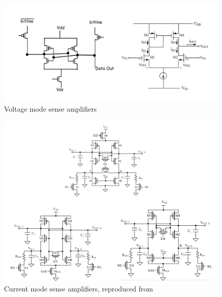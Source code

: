 \begin{figure}
  \centering
  \includegraphics[width=\textwidth]{../fig/hfdstk-sensamp-voltagemode.png}
  \caption[Voltage mode sense amplifiers]{Voltage mode sense amplifiers}
  \label{fig:voltagemodesa}
\end{figure}
\begin{figure}
  \centering
  \includegraphics[width=\textwidth]{../fig/hfdstk-sensamp-currentmode.png}
  \caption[Current mode sense amplifiers]{Current mode sense amplifiers, reproduced from\cite{5548588}}
  \label{fig:currentmodesa}
\end{figure}

